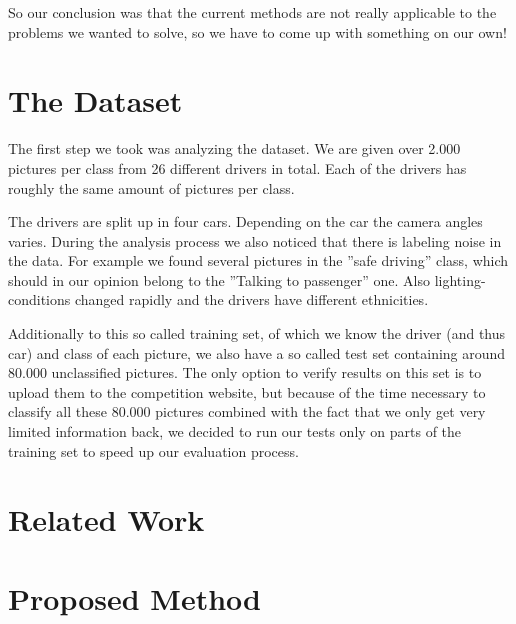 \documentclass[10pt,twocolumn,letterpaper]{article}
\begin{document}
So our conclusion was that the current methods are not really applicable to the problems we wanted to solve, so we have to come up with something on our own!







\section{The Dataset}
The first step we took was analyzing the dataset. We are given over 2.000 pictures per class from 26 different drivers in total. Each of the drivers has roughly the same amount of pictures per class. 

The drivers are split up in four cars. Depending on the car the camera angles varies. During the analysis process we also noticed that there is labeling noise in the data. For example we found several pictures in the ''safe driving'' class, which should in our opinion belong to the ''Talking to passenger'' one. Also lighting-conditions changed rapidly and the drivers have different ethnicities.


Additionally to this so called training set, of which we know the driver (and thus car) and class of each picture, we also have a so called test set containing around 80.000 unclassified pictures. The only option to verify results on this set is to upload them to the competition website, but because of the time necessary to classify all these 80.000 pictures combined with the fact that we only get very limited information back, we decided to run our tests only on parts of the training set to speed up our evaluation process.




\section{Related Work}



\section{Proposed Method}
\end{document}
